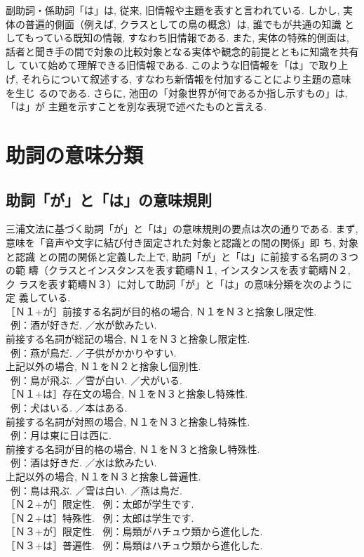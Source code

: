副助詞・係助詞「は」は, 従来, 旧情報や主題を表すと言われている. しかし, 
実体の普遍的側面（例えば, クラスとしての鳥の概念）は, 誰でもが共通の知識
としてもっている既知の情報, すなわち旧情報である. また, 実体の特殊的側面は, 
話者と聞き手の間で対象の比較対象となる実体や観念的前提とともに知識を共有し
ていて始めて理解できる旧情報である. このような旧情報を「は」で取り上げ, 
それらについて叙述する, すなわち新情報を付加することにより主題の意味を生じ
るのである. さらに, 池田の「対象世界が何であるか指し示すもの」は, 「は」が
主題を示すことを別な表現で述べたものと言える. 

\section{助詞の意味分類}
\subsection{助詞「が」と「は」の意味規則}
\label{sec:gatoha}
三浦文法に基づく助詞「が」と「は」の意味規則の要点は次の通りである. 
まず, 意味を「音声や文字に結び付き固定された対象と認識との間の関係」即
ち, 対象と認識
との間の関係と定義した上で, 助詞「が」と「は」に前接する名詞の３つの範
疇（クラスとインスタンスを表す範疇Ｎ１, インスタンスを表す範疇Ｎ２, ク
ラスを表す範疇Ｎ３）に対して助詞「が」と「は」の意味分類を次のように定
義している. \\
［Ｎ１+が］前接する名詞が目的格の場合, Ｎ１をＮ３と捨象し限定性. \\
~例：酒が好きだ. ／水が飲みたい. \\
前接する名詞が総記の場合, Ｎ１をＮ３と捨象し限定性. \\
~例：燕が鳥だ. ／子供がかかりやすい. \\
上記以外の場合, Ｎ１をＮ２と捨象し個別性. \\
~例：鳥が飛ぶ. ／雪が白い. ／犬がいる. \\
［Ｎ１+は］存在文の場合, Ｎ１をＮ３と捨象し特殊性. \\
~例：犬はいる. ／本はある. \\
前接する名詞が対照の場合, Ｎ１をＮ３と捨象し特殊性. \\
~例：月は東に日は西に. \\
前接する名詞が目的格の場合, Ｎ１をＮ３と捨象し特殊性. \\
~例：酒は好きだ. ／水は飲みたい. \\
上記以外の場合, Ｎ１をＮ３と捨象し普遍性. \\
~例：鳥は飛ぶ. ／雪は白い. ／燕は鳥だ. \\
［Ｎ２+が］限定性. ~例：太郎が学生です. \\
［Ｎ２+は］特殊性. ~例：太郎は学生です. \\
［Ｎ３+が］限定性. ~例：鳥類がハチュウ類から進化した. \\
［Ｎ３+は］普遍性. ~例：鳥類はハチュウ類から進化した. 

